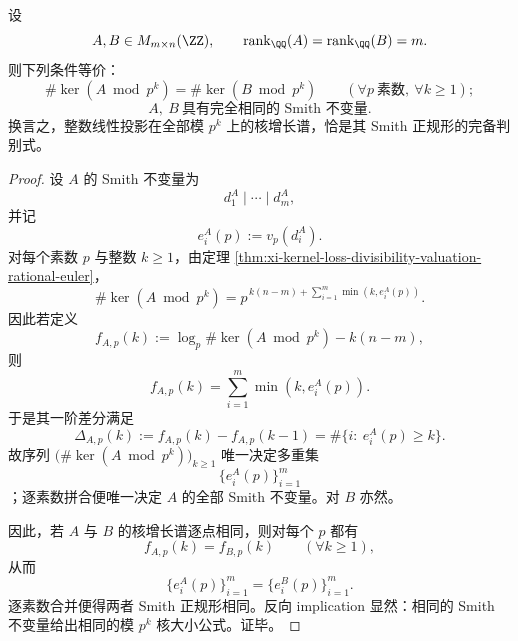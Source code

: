 \begin{theorem}\label{thm:xi-time-part63b-smith-kernel-growth-spectrum-criterion}
设
\[
A,B\in M_{m\times n}(\ZZ),
\qquad
\operatorname{rank}_{\QQ}(A)=\operatorname{rank}_{\QQ}(B)=m.
\]
则下列条件等价：
\[
\#\ker(A\bmod p^k)=\#\ker(B\bmod p^k)
\qquad
(\forall p\ \text{素数},\ \forall k\ge 1);
\]
\[
A,\ B\ \text{具有完全相同的 Smith 不变量}.
\]
换言之，整数线性投影在全部模 \(p^k\) 上的核增长谱，恰是其 Smith 正规形的完备判别式。
\end{theorem}
\begin{proof}
设 \(A\) 的 Smith 不变量为
\[
d_1^{A}\mid \cdots \mid d_m^{A},
\]
并记
\[
e_i^{A}(p):=v_p(d_i^{A}).
\]
对每个素数 \(p\) 与整数 \(k\ge 1\)，由定理 \ref{thm:xi-kernel-loss-divisibility-valuation-rational-euler}，
\[
\#\ker(A\bmod p^k)
=
p^{\,k(n-m)+\sum_{i=1}^{m}\min(k,e_i^{A}(p))}.
\]
因此若定义
\[
f_{A,p}(k):=
\log_p\#\ker(A\bmod p^k)-k(n-m),
\]
则
\[
f_{A,p}(k)=\sum_{i=1}^{m}\min(k,e_i^{A}(p)).
\]
于是其一阶差分满足
\[
\Delta_{A,p}(k):=
f_{A,p}(k)-f_{A,p}(k-1)
=
\#\{i:\ e_i^{A}(p)\ge k\}.
\]
故序列 \(\bigl(\#\ker(A\bmod p^k)\bigr)_{k\ge 1}\) 唯一决定多重集
\[
\{e_i^{A}(p)\}_{i=1}^{m}
\]
；逐素数拼合便唯一决定 \(A\) 的全部 Smith 不变量。对 \(B\) 亦然。

因此，若 \(A\) 与 \(B\) 的核增长谱逐点相同，则对每个 \(p\) 都有
\[
f_{A,p}(k)=f_{B,p}(k)
\qquad(\forall k\ge 1),
\]
从而
\[
\{e_i^{A}(p)\}_{i=1}^{m}
=
\{e_i^{B}(p)\}_{i=1}^{m}.
\]
逐素数合并便得两者 Smith 正规形相同。反向 implication 显然：相同的 Smith 不变量给出相同的模 \(p^k\) 核大小公式。证毕。
\end{proof}

